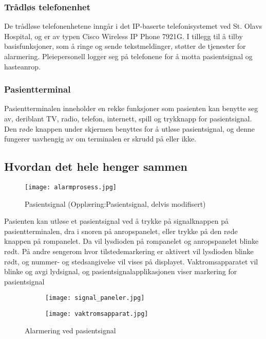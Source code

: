 \subsubsection{Trådløs telefonenhet}
De trådløse telefonenhetene inngår i det IP-baserte telefonisystemet ved St. Olavs Hospital, og er av typen Cisco Wireless IP Phone 7921G. I tillegg til å tilby basisfunksjoner, som å ringe og sende tekstmeldinger, støtter de tjenester for alarmering. Pleiepersonell logger seg på telefonene for å motta pasientsignal og hasteanrop.

\subsubsection{Pasientterminal}
Pasientterminalen inneholder en rekke funksjoner som pasienten kan benytte seg av, deriblant TV, radio, telefon, internett, spill og trykknapp for pasientsignal. Den røde knappen under skjermen benyttes for å utløse pasientsignal, og denne fungerer uavhengig av om terminalen er skrudd på eller ikke.

\pagebreak
\subsection{Hvordan det hele henger sammen}
\begin{figure}[H]
\centering
\texttt{[image: alarmprosess.jpg]}
\caption{Pasientsignal (Opplæring:Pasientsignal, delvis modifisert)}
\label{alarmprosess}
\end{figure}
\noindent
Pasienten kan utløse et pasientsignal ved å trykke på signalknappen på pasientterminalen, dra i snoren på anropspanelet, eller trykke på den røde knappen på rompanelet. Da vil lysdioden på rompanelet og anropspanelet blinke rødt. På andre sengerom hvor tilstedemarkering er aktivert vil lysdioden blinke rødt, og nummer- og stedsangivelse vil vises på displayet. Vaktromsapparatet vil blinke og avgi lydsignal, og pasientsignalapplikasjonen viser markering for pasientsignal 
\begin{figure}[H]
        \centering
        \begin{subfigure}[b]{0.35\textwidth}
        		\centering
                \texttt{[image: signal\_paneler.jpg]}
        \end{subfigure}
        \begin{subfigure}[b]{0.35\textwidth}
        		\centering
                \texttt{[image: vaktromsapparat.jpg]}
                \label{telefon}
        \end{subfigure}
        \caption{Alarmering ved pasientsignal}\label{pasientsignalalarm}
\end{figure}

